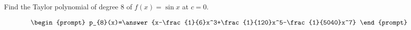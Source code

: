 \documentclass{ximera}
\author{Gregory Hartman \and Matthew Carr}
\begin{document}
\begin{exercise}




Find the Taylor polynomial of degree $8$ of $f(x)=\sin x$ at $c=0$.

\[
\begin{prompt}
p_{8}(x)=\answer{x-\frac{1}{6}x^3+\frac{1}{120}x^5-\frac{1}{5040}x^7}
\end{prompt}
\]

\end{exercise}
\end{document}
